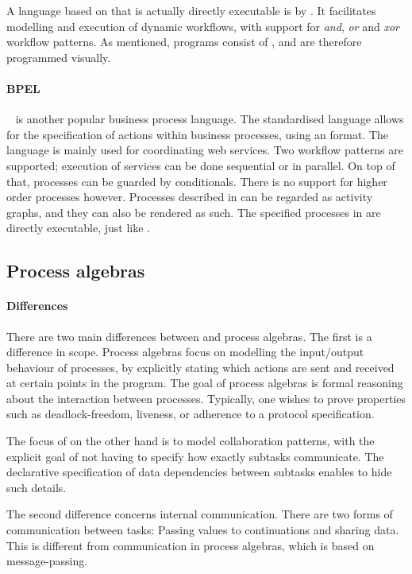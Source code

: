 A language based on \WFN that is actually directly executable is \YAWL by \citet{DBLP:journals/is/AalstH05}.
It facilitates modelling and execution of dynamic workflows, with support for \emph{and}, \emph{or} and \emph{xor} workflow patterns.
As mentioned, \YAWL programs consist of \WFN, and are therefore programmed visually.

\paragraph{BPEL}

\BPEL~\cite{bpel} is another popular business process language. The standardised
language allows for the specification of actions within business processes,
using an \XML format.
The language is mainly used for coordinating web services.
Two workflow patterns are supported; execution of services can be done sequential or in parallel.
On top of that, processes can be guarded by conditionals.
There is no support for higher order processes however.
Processes described in \BPEL can be regarded as activity graphs, and they can also be rendered as such.
The specified processes in \BPEL are directly executable, just like \YAWL.



\subsection{Process algebras}

\paragraph{Differences}
There are two main differences between \TOP and process algebras.
The first is a difference in scope.
Process algebras focus on modelling the input/output behaviour of processes, by explicitly stating which actions are sent and received at certain points in the program.
The goal of process algebras is formal reasoning about the interaction between processes.
Typically, one wishes to prove properties such as deadlock-freedom, liveness, or adherence to a protocol specification.

The focus of \TOP on the other hand is to model collaboration patterns, with the explicit goal of not having to specify how exactly subtasks communicate.
The declarative specification of data dependencies between subtasks enables \TOP to hide such details.

The second difference concerns internal communication.
There are two forms of communication between tasks: Passing values to continuations and sharing data.
This is different from communication in process algebras, which is based on message-passing.


